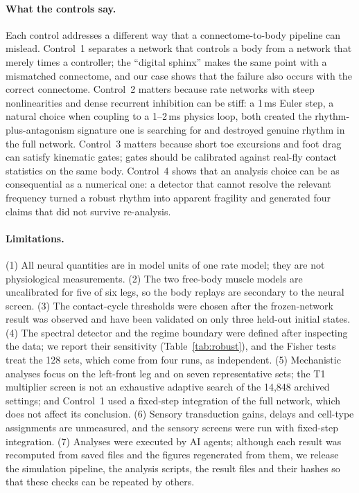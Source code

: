 \documentclass[11pt]{article}
\begin{document}
\paragraph{What the controls say.} Each control addresses a different way that a connectome-to-body pipeline can mislead. Control~1 separates a network that controls a body from a network that merely times a controller; the ``digital sphinx'' \citep{brunton2026sphinx} makes the same point with a mismatched connectome, and our case shows that the failure also occurs with the correct connectome. Control~2 matters because rate networks with steep nonlinearities and dense recurrent inhibition can be stiff: a 1\,ms Euler step, a natural choice when coupling to a 1--2\,ms physics loop, both created the rhythm-plus-antagonism signature one is searching for and destroyed genuine rhythm in the full network. Control~3 matters because short toe excursions and foot drag can satisfy kinematic gates; gates should be calibrated against real-fly contact statistics on the same body. Control~4 shows that an analysis choice can be as consequential as a numerical one: a detector that cannot resolve the relevant frequency turned a robust rhythm into apparent fragility and generated four claims that did not survive re-analysis.

\paragraph{Limitations.} (1) All neural quantities are in model units of one rate model; they are not physiological measurements. (2) The two free-body muscle models are uncalibrated for five of six legs, so the body replays are secondary to the neural screen. (3) The contact-cycle thresholds were chosen after the frozen-network result was observed and have been validated on only three held-out initial states. (4) The spectral detector and the regime boundary were defined after inspecting the data; we report their sensitivity (Table~\ref{tab:robust}), and the Fisher tests treat the 128 sets, which come from four runs, as independent. (5) Mechanistic analyses focus on the left-front leg and on seven representative sets; the T1 multiplier screen is not an exhaustive adaptive search of the 14,848 archived settings; and Control~1 used a fixed-step integration of the full network, which does not affect its conclusion. (6) Sensory transduction gains, delays and cell-type assignments are unmeasured, and the sensory screens were run with fixed-step integration. (7) Analyses were executed by AI agents; although each result was recomputed from saved files and the figures regenerated from them, we release the simulation pipeline, the analysis scripts, the result files and their hashes so that these checks can be repeated by others.
\end{document}
